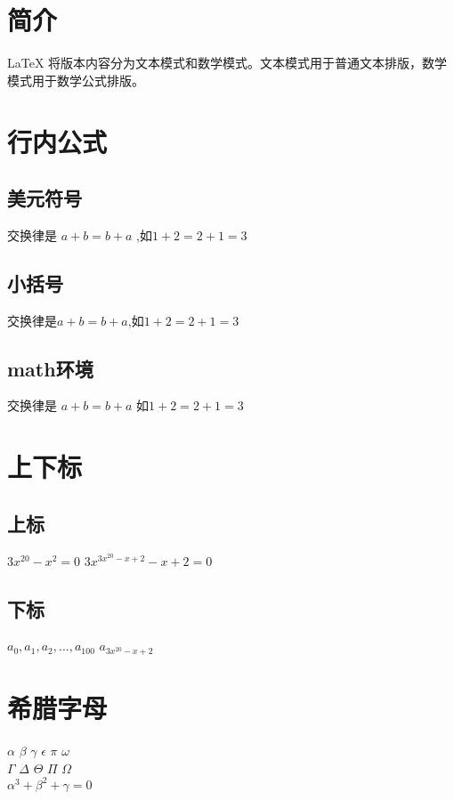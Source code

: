 \documentclass{ctexart}
\begin{document}
	\section{简介}
	\LaTeX{} 将版本内容分为文本模式和数学模式。文本模式用于普通文本排版，数学模式用于数学公式排版。
	\section{行内公式}
	\subsection{美元符号}
	交换律是 $a+b=b+a$ ,如$1+2=2+1=3$
		
	\subsection{小括号}
	交换律是\(a+b=b+a\),如\(1+2=2+1=3\)
	\subsection{math环境}
		交换律是 \begin{math} a+b=b+a\end{math}
	如\begin{math}
		1+2=2+1=3
	\end{math}

	\section{上下标}

	\subsection{上标}
		$3x^{20}-x^2=0$ 
	$3x^{3x^{20}-x+2}-x+2=0 $ 
	\subsection{下标}
	$a_0,a_1,a_2,...,a_{100}$ 
	$a_{3x^{20}-x+2}$ 
	
	\section{希腊字母}
	$\alpha$
	$\beta$ 
	$\gamma$
	$\epsilon$
	$\pi$
	$\omega$ 
	\\ 
	
	$\Gamma$
	$\Delta$
	$\Theta$
	$\Pi$
	$\Omega$ \\
	$\alpha^3+\beta^2+\gamma = 0 $
	
\end{document}
